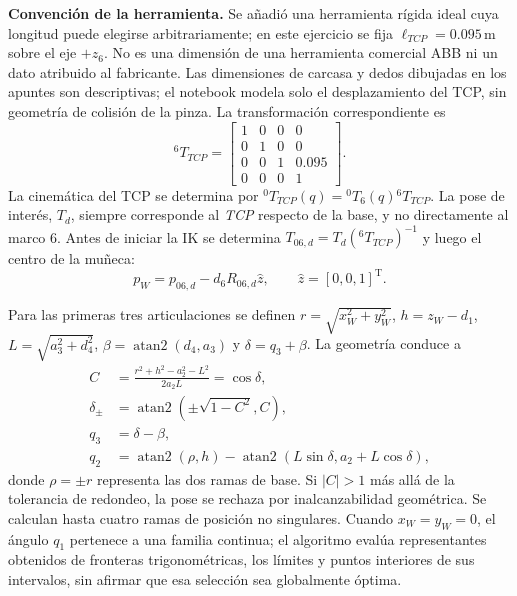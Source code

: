 \documentclass[conference,letterpaper]{IEEEtran}
\newcommand{\trans}{\mathrm{T}}
\newcommand{\atanDos}{\operatorname{atan2}}
\begin{document}
	\textbf{Convención de la herramienta.} Se añadió una herramienta rígida ideal cuya longitud puede elegirse arbitrariamente; en este ejercicio se fija \(\ell_{TCP}=0.095\,\mathrm{m}\) sobre el eje \(+z_6\). No es una dimensión de una herramienta comercial ABB ni un dato atribuido al fabricante. Las dimensiones de carcasa y dedos dibujadas en los apuntes son descriptivas; el notebook modela solo el desplazamiento del TCP, sin geometría de colisión de la pinza. La transformación correspondiente es
	\begin{equation}
		{}^6T_{TCP}=\begin{bmatrix}
			1&0&0&0\\0&1&0&0\\0&0&1&0.095\\0&0&0&1
		\end{bmatrix}.
		\label{eq:tcp}
	\end{equation}
	La cinemática del TCP se determina por
	\({}^0T_{TCP}(q)={}^0T_6(q){}^6T_{TCP}\).
	La pose de interés, \(T_d\), siempre corresponde al \emph{TCP} respecto de la base, y no directamente al marco 6. Antes de iniciar la IK se determina \(T_{06,d}=T_d({}^6T_{TCP})^{-1}\) y luego el centro de la muñeca:
	\begin{equation}
		p_W=p_{06,d}-d_6R_{06,d}\hat z,\qquad \hat z=[0,0,1]^\trans.
		\label{eq:pw}
	\end{equation}
	
	Para las primeras tres articulaciones se definen \(r=\sqrt{x_W^2+y_W^2}\), \(h=z_W-d_1\), \(L=\sqrt{a_3^2+d_4^2}\), \(\beta=\atanDos(d_4,a_3)\) y \(\delta=q_3+\beta\). La geometría conduce a
	\begin{align}
		C&=\frac{r^2+h^2-a_2^2-L^2}{2a_2L}=\cos\delta,\label{eq:C}\\
		\delta_{\pm}&=\atanDos\!\left(\pm\sqrt{1-C^2},C\right),\label{eq:delta}\\
		q_3&=\delta-\beta,\label{eq:q3}\\
		q_2&=\atanDos(\rho,h)-\atanDos(L\sin\delta,a_2+L\cos\delta),\label{eq:q2}
	\end{align}
	donde \(\rho=\pm r\) representa las dos ramas de base. Si \(|C|>1\) más allá de la tolerancia de redondeo, la pose se rechaza por inalcanzabilidad geométrica. Se calculan hasta cuatro ramas de posición no singulares. Cuando \(x_W=y_W=0\), el ángulo \(q_1\) pertenece a una familia continua; el algoritmo evalúa representantes obtenidos de fronteras trigonométricas, los límites y puntos interiores de sus intervalos, sin afirmar que esa selección sea globalmente óptima.
	
\end{document}
